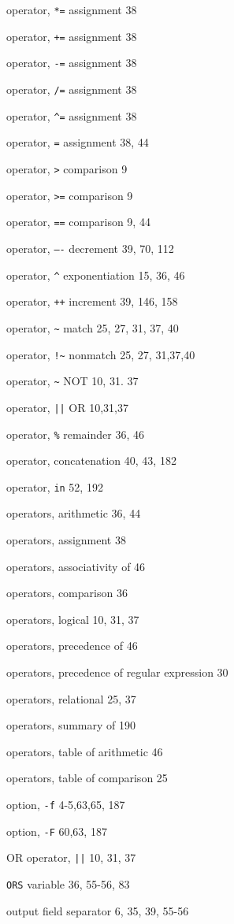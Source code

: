 \begin{multicols}{3}
operator, \verb'*=' assignment 38

operator, \verb'+=' assignment 38

operator, \verb'-=' assignment 38

operator, \verb'/=' assignment 38

operator, \verb'^=' assignment 38

operator, \verb'=' assignment 38, 44

operator, \verb'>' comparison 9

operator, \verb'>=' comparison 9

operator, \verb'==' comparison 9, 44

operator, \verb'—-' decrement 39, 70, 112

operator, \verb'^' exponentiation 15, 36, 46

operator, \verb'++' increment 39, 146, 158

operator, \verb'~' match 25, 27, 31, 37, 40

operator, \verb'!~' nonmatch 25, 27, 31,37,40

operator, \verb'~' NOT 10, 31. 37

operator, \verb'||' OR 10,31,37

operator, \verb'%' remainder 36, 46

operator, concatenation 40, 43,  182

operator, \verb'in' 52, 192

operators, arithmetic 36, 44

operators, assignment 38

operators, associativity of 46

operators, comparison 36

operators, logical 10, 31, 37

operators, precedence of 46

operators, precedence of regular expression 30

operators, relational 25, 37

operators, summary of 190

operators, table of arithmetic 46

operators, table of comparison 25

option, \verb'-f' 4-5,63,65, 187

option, \verb'-F' 60,63, 187

OR operator, \verb'||' 10, 31, 37

\verb'ORS' variable 36, 55-56, 83

output field separator 6, 35, 39, 55-56


\end{multicols}
